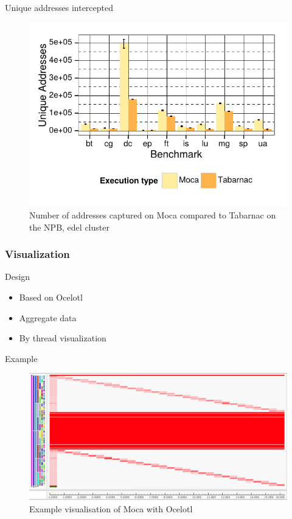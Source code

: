 \documentclass[xcolor={usenames,dvipsnames}]{beamer}
\begin{document}
\begin{frame}{Unique addresses intercepted}
    \begin{figure}[]
        \centering
        \includegraphics[width=.7\linewidth]{moca_addresses_nas.pdf}
        \caption{Number of addresses captured on Moca compared to Tabarnac on the NPB, edel
        cluster}
    \end{figure}
\end{frame}
\subsubsection*{Visualization}

\begin{frame}{Design}
    \begin{itemize}
        \item Based on Ocelotl~\cite{Dosimont14Trace}
        \item Aggregate data
        \item By thread visualization
    \end{itemize}
\end{frame}

\begin{frame}{Example}
    \begin{figure}[]
        \centering
        \includegraphics[width=\linewidth]{ocelotl.png}
        \caption{Example visualisation of Moca with Ocelotl}
    \end{figure}
\end{frame}
\end{document}
